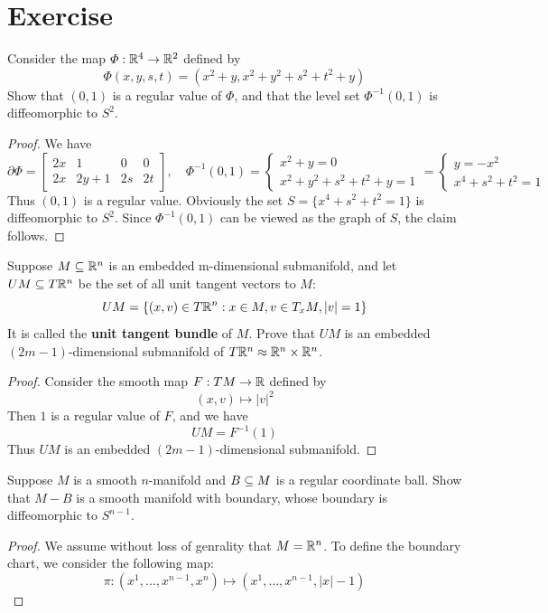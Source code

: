 \section{Exercise}
\begin{exercise}
Consider the map $\varPhi:\mathbb{R}^4\to\mathbb{R}^2$ defined by
\[\varPhi(x,y,s,t)=(x^2+y,x^2+y^2+s^2+t^2+y)\]
Show that $(0,1)$ is a regular value of $\varPhi$, and that the level set $\varPhi^{-1}(0,1)$ is diffeomorphic to $S^2$.
\end{exercise}
\begin{proof}
We have
\[\partial\varPhi=\begin{bmatrix}
2x&1&0&0\\
2x&2y+1&2s&2t
\end{bmatrix},\quad\varPhi^{-1}(0,1)=\left\{\begin{array}{l}
x^2+y=0\\
x^2+y^2+s^2+t^2+y=1
\end{array}\right. =\left\{\begin{array}{l}
y=-x^2\\
x^4+s^2+t^2=1
\end{array}\right. \]
Thus $(0,1)$ is a regular value. Obviously the set $S=\{x^4+s^2+t^2=1\}$ is diffeomorphic to $S^2$. Since $\varPhi^{-1}(0,1)$ can be viewed as the graph of $S$, the claim follows.
\end{proof}
\begin{exercise}
Suppose $M\subseteq\mathbb{R}^n$ is an embedded m-dimensional submanifold, and let $UM\subseteq T\mathbb{R}^n$ be the set of all unit tangent vectors to $M$:
\[UM=\{(x,v)\in T\mathbb{R}^n:x\in M,v\in T_xM,|v|=1\}\]
It is called the \textbf{unit tangent bundle} of $M$. Prove that $UM$ is an embedded $(2m-1)$-dimensional submanifold of $T\mathbb{R}^n\approx\mathbb{R}^n\times\mathbb{R}^n$.
\end{exercise}
\begin{proof}
Consider the smooth map $F:TM\to\mathbb{R}$ defined by
\[(x,v)\mapsto|v|^2\]
Then $1$ is a regular value of $F$, and we have
\[UM=F^{-1}(1)\]
Thus $UM$ is an embedded $(2m-1)$-dimensional submanifold.
\end{proof}
\begin{exercise}\label{delete coordinate ball}
Suppose $M$ is a smooth $n$-manifold and $B\subseteq M$ is a regular coordinate ball. Show that $M-B$ is a smooth manifold with boundary, whose boundary is diffeomorphic to $S^{n-1}$.
\end{exercise}
\begin{proof}
We assume without loss of genrality that $M=\mathbb{R}^n$. To define the boundary chart, we consider the following map:
\[\pi:(x^1,\dots,x^{n-1},x^n)\mapsto(x^1,\dots,x^{n-1},|x|-1)\]
\end{proof}
